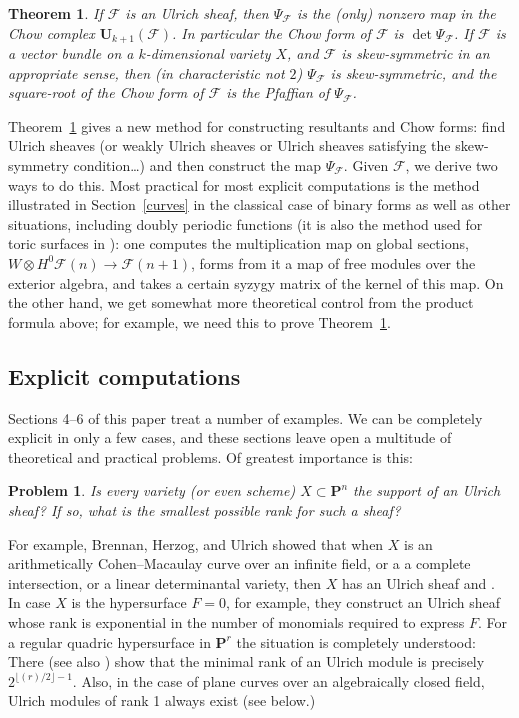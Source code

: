 \documentclass{jams-l}
\newtheorem{theorem}{Theorem}[section]
\newtheorem*{problem}{Problem}
\theoremstyle{definition}
\theoremstyle{remark}
\newcommand{\F}{{\mathcal F}}
\newcommand{\PP}{{\mathbf P}}
\newcommand{\UU}{{\mathbf U}}
\begin{document}
\begin{theorem}\label{third main} If $\F$ is an Ulrich sheaf, then
$\Psi_\F$ is the (only) nonzero map in the Chow complex $\UU_{k+1}(\F)$.
In particular
the Chow form of $\F$ is $\det \Psi_\F$. If $\F$ is
a vector bundle on a $k$-dimensional variety $X$, and
$\F$ is skew-symmetric in an appropriate sense, then
(in characteristic not $2$) $\Psi_\F$  is skew-symmetric, 
and the square-root of the Chow form of $\F$ is the
Pfaffian of $\Psi_\F$.
\end{theorem}

Theorem~\ref{third main} gives a new method for constructing
resultants and Chow forms:
find Ulrich sheaves (or weakly Ulrich sheaves or Ulrich
sheaves satisfying the skew-symmetry condition\dots) and then
construct the map $\Psi_\F$. Given $\F$, we derive two
ways to do this. Most practical for most explicit computations
is the method illustrated in Section~\ref{curves} in the 
classical case of binary forms as well as other situations,
including doubly periodic functions (it is also the method
used for toric surfaces in \cite{Khetan 2002}): one computes
the multiplication map on global sections, $W\otimes H^0\F(n)\to \F(n+1)$,
forms from it a map of free modules over the exterior algebra, and
takes a certain syzygy matrix of the kernel of this map.
On the other hand, we get somewhat more theoretical control from
the product formula above; for example, we need this to prove
Theorem~\ref{third main}.

\subsection*{Explicit computations }

Sections 4--6 of
this paper treat a number of examples. 
We can be completely explicit in
only a few cases, and these sections 
leave open a multitude of theoretical and practical problems.
Of greatest importance is this:

\begin{problem} Is every variety (or even scheme) $X\subset \PP^n$ 
the support of an Ulrich 
sheaf? If so, what is the smallest possible rank for such a sheaf?
\end{problem}

For example, Brennan, Herzog, and Ulrich showed that when $X$ is
an arithmetically Cohen--Macaulay curve over an infinite field, or a
a complete intersection, or a linear determinantal variety, then
$X$ has an Ulrich sheaf \cite{Brennanetal.1987}
and \cite{Backelin and Herzog}. In case
$X$ is the hypersurface $F=0$, for example,
they construct an Ulrich sheaf whose rank is exponential
in the number of monomials required to express $F$.
For a regular quadric hypersurface
in $\PP^r$ the situation is 
completely 
understood: There  
\cite{BuchweitzEisenbudandHerzog1987}
(see also \cite{Swan 1985}) show that the minimal rank of an Ulrich module
is precisely $2^{\lfloor (r)/2\rfloor-1}$. 
Also, in the case of plane curves over an algebraically closed
field, Ulrich modules of rank 1 always exist
(see below.)
\end{document}
